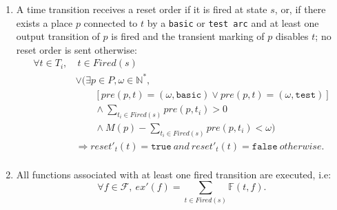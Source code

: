 \begin{definition}
\begin{itemize}
\begin{enumerate}[%
      resume]
    \item\label{it:reset-order} A time transition receives a reset
      order if it is fired at state $s$, or, if there exists a place
      $p$ connected to $t$ by a \texttt{basic} or \texttt{test arc}
      and at least one output transition of $p$ is fired and the
      transient marking of $p$ disables $t$; no reset order is sent
      otherwise:
      \begin{equation*}
        \begin{split}
          \forall{}t\in{}T_i,&~t\in{}Fired(s) \\
                             &\lor\big(\exists{}p\in{}P,\omega\in\mathbb{N}^{*}, \\
                             &\quad\quad{}[pre(p,t)=(\omega,\mathtt{basic})\lor{}pre(p,t)=(\omega,\mathtt{test})] \\
                             &\quad\quad\land\sum\limits_{t_i\in{}Fired(s)}pre(p,t_i)>0 \\
                             &\quad\quad\land{}M(p)-\sum\limits_{t_i\in{}Fired(s)}pre(p,t_i)<\omega\big)\\
                             & \Rightarrow{}reset'_t(t)=\mathtt{true}~and~reset'_t(t)=\mathtt{false}~otherwise.  \\
        \end{split}
      \end{equation*}
      
    \item\label{it:exec-fun} All functions associated with at least one fired transition are executed, i.e:
      \begin{equation*}
        \forall{}f\in{}\mathcal{F},~ex'(f)=\sum\limits_{t\in{}Fired(s)}\mathbb{F}(t,f).
      \end{equation*}
    \end{enumerate}
  \end{itemize}
\end{definition}


